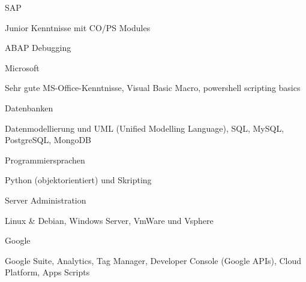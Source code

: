 


\begin{cventries}
	
	\zcventry
	{SAP} %
	{
		\begin{cvitems} %
			\item {Junior Kenntnisse mit CO/PS Modules}
			\item {ABAP Debugging}
		\end{cvitems}
	}
	
	\zcventry
	{Microsoft} %
	{
		\begin{cvitems} %
			\item {Sehr gute MS-Office-Kenntnisse, Visual Basic Macro, powershell scripting basics}
		\end{cvitems}
	}
	
	\zcventry
	{Datenbanken} %
	{
		\begin{cvitems} %
			\item {Datenmodellierung und UML (Unified Modelling Language), SQL, MySQL, PostgreSQL, MongoDB}
		\end{cvitems}
	}
	
	\zcventry
	{Programmiersprachen} %
	{
		\begin{cvitems} %
			\item {Python (objektorientiert) und Skripting}
		\end{cvitems}
	}
	
	\zcventry
	{Server Administration} %
	{
		\begin{cvitems} %
			\item {Linux \& Debian, Windows Server, VmWare und Vsphere}
		\end{cvitems}
	}
	
	\zcventry
	{Google} %
	{
		\begin{cvitems} %
			\item {Google Suite, Analytics, Tag Manager, Developer Console (Google APIs), Cloud Platform, Apps Scripts}
		\end{cvitems}
	}
	
	
\end{cventries}
